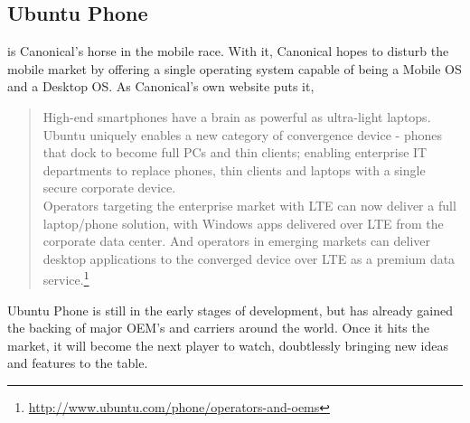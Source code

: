  

\subsection{Ubuntu Phone}
 is Canonical's horse in the mobile race. With it, Canonical hopes to disturb the mobile market by offering a single operating system capable of being a Mobile OS and a Desktop OS. As Canonical's own website puts it, 

\begin{quotation}
High-end smartphones have a brain as powerful as ultra-light laptops. Ubuntu uniquely enables a new category of convergence device - phones that dock to become full PCs and thin clients; enabling enterprise IT departments to replace phones, thin clients and laptops with a single secure corporate device.\\

Operators targeting the enterprise market with LTE can now deliver a full laptop/phone solution, with Windows apps delivered over LTE from the corporate data center. And operators in emerging markets can deliver desktop applications to the converged device over LTE as a premium data service.\footnote{\url{http://www.ubuntu.com/phone/operators-and-oems}}
\end{quotation}


Ubuntu Phone is still in the early stages of development, but has already gained the backing of major OEM's and carriers around the world. Once it hits the market, it will become the next player to watch, doubtlessly bringing new ideas and features to the table.  
















 